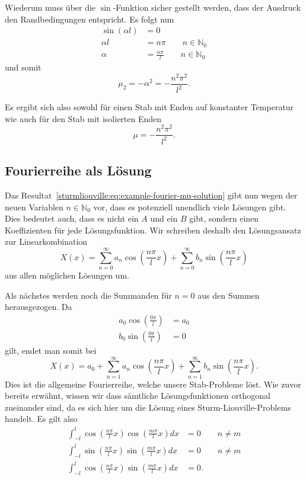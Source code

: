 Wiederum muss über die $\sin$-Funktion sicher gestellt werden, dass der
Ausdruck den Randbedingungen entspricht.
Es folgt nun
\[
\begin{aligned}
    \sin(\alpha l) &= 0 \\
    \alpha l &= n \pi \qquad n \in \mathbb{N}_0 \\
    \alpha &= \frac{n \pi}{l} \qquad n \in \mathbb{N}_0
\end{aligned}
\]
und somit
\[
    \mu_2 = -\alpha^{2} = -\frac{n^{2}\pi^{2}}{l^{2}}.
\]

Es ergibt sich also sowohl für einen Stab mit Enden auf konstanter Temperatur
wie auch für den Stab mit isolierten Enden
\begin{equation}
    \label{sturmliouville:eq:example-fourier-mu-solution}
    \mu
    =
    -\frac{n^{2}\pi^{2}}{l^{2}}.
\end{equation}

\subsection{Fourierreihe als Lösung}

Das Resultat~\eqref{sturmliouville:eq:example-fourier-mu-solution} gibt nun
wegen der neuen Variablen $n \in \mathbb{N}_0$ vor, dass es potenziell
unendlich viele Lösungen gibt.
Dies bedeutet auch, dass es nicht ein $A$ und ein $B$ gibt, sondern einen
Koeffizienten für jede Lösungsfunktion.
Wir schreiben deshalb den Lösungsansatz zur Linearkombination
\[
    X(x)
    =
    \sum_{n = 0}^{\infty} a_n\cos\left(\frac{n\pi}{l}x\right)
    +
    \sum_{n = 0}^{\infty} b_n\sin\left(\frac{n\pi}{l}x\right)
\]
aus allen möglichen Lösungen um.

Als nächstes werden noch die Summanden für $n = 0$ aus den Summen herausgezogen.
Da
\[
    \begin{aligned}
        a_0 \cos\left(\frac{0 \pi}{l}\right) &= a_0 \\
        b_0 \sin\left(\frac{0 \pi}{l}\right) &= 0
    \end{aligned}
\]
gilt, endet man somit bei
\[
    X(x)
    =
    a_0
    +
    \sum_{n = 1}^{\infty} a_n\cos\left(\frac{n\pi}{l}x\right)
    +
    \sum_{n = 1}^{\infty} b_n\sin\left(\frac{n\pi}{l}x\right).
\]
Dies ist die allgemeine Fourierreihe, welche unsere Stab-Probleme löst.
Wie zuvor bereits erwähnt, wissen wir dass sämtliche Lösungsfunktionen
orthogonal zueinander sind, da es sich hier um die Lösung eines
Sturm-Liouville-Problems handelt.
Es gilt also
\[
\begin{aligned}
    \int_{-l}^{l}\cos\left(\frac{n \pi}{l}x\right)
    \cos\left(\frac{m \pi}{l}x\right)dx
    &= 0 \qquad n \neq m \\
    \int_{-l}^{l}\sin\left(\frac{n \pi}{l}x\right)
    \sin\left(\frac{m \pi}{l}x\right)dx
    &= 0 \qquad n \neq m \\
    \int_{-l}^{l}\cos\left(\frac{n \pi}{l}x\right)
    \sin\left(\frac{m \pi}{l}x\right)dx
    &= 0.
\end{aligned}
\]

